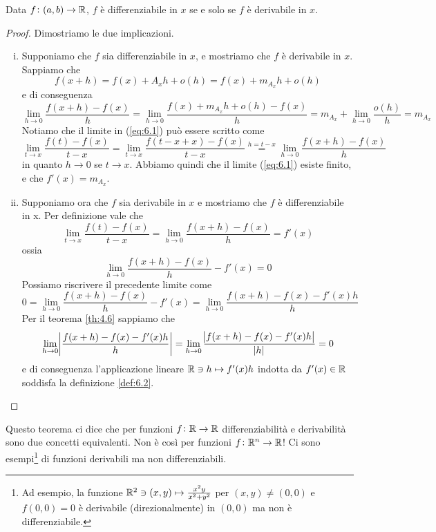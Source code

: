 \begin{theorem}
    \label{th:6.1}
    Data $f\colon (a,b)\to\amsbb{R}$, $f$ è differenziabile in $x$ se e solo se $f$ è derivabile in $x$.
\end{theorem}
\begin{proof}
    Dimostriamo le due implicazioni.
    \begin{enumerate}[(i)]
        \item Supponiamo che $f$ sia differenziabile in $x$, e mostriamo che $f$ è derivabile in $x$. Sappiamo che
        \[
        f(x+h)=f(x)+A_x h +o(h) = f(x)+m_{A_x}h +o(h)
        \]
        e di conseguenza
        \[
        \lim_{h\to 0} \frac{f(x+h)-f(x)}{h} = \lim_{h\to 0} \frac{f(x)+m_{A_x}h+o(h)-f(x)}{h} = m_{A_x}+\lim_{h\to 0} \frac{o(h)}{h} = m_{A_x} 
        \]
        Notiamo che il limite in (\ref{eq:6.1}) può essere scritto come
        \[
        \lim_{t\to x} \frac{f(t)-f(x)}{t-x} = \lim_{t\to x} \frac{f(t-x+x)-f(x)}{t-x}\overset{h=t-x}{=} \lim_{h\to 0} \frac{f(x+h)-f(x)}{h}
        \]
        in quanto $h\to 0$ se $t\to x$. Abbiamo quindi che il limite (\ref{eq:6.1}) esiste finito, e che $f'(x) = m_{A_x}$.
        \item Supponiamo ora che $f$ sia derivabile in $x$ e mostriamo che $f$ è differenziabile in x. Per definizione vale che
        \[
        \lim_{t\to x}\frac{f(t)-f(x)}{t-x} = \lim_{h\to 0}\frac{f(x+h)-f(x)}{h} = f'(x)
        \]
        ossia
        \[
        \lim_{h\to 0}\frac{f(x+h)-f(x)}{h}-f'(x) = 0
        \]
        Possiamo riscrivere il precedente limite come
        \[
        0=\lim_{h\to 0}\frac{f(x+h)-f(x)}{h}-f'(x) = \lim_{h\to 0} \frac{f(x+h)-f(x)-f'(x)h}{h}
        \]
        Per il teorema \ref{th:4.6} sappiamo che 
        \[
        \lim_{h\to 0}\abs{\frac{f(x+h)-f(x)-f'(x)h}{h}} = \lim_{h\to 0} \frac{\abs{f(x+h)-f(x)-f'(x)h}}{\abs{h}}=0
        \]
        e di conseguenza l'applicazione lineare $\amsbb{R}\ni h \mapsto f'(x)h$ indotta da $f'(x)\in\amsbb{R}$ soddisfa la definizione \ref{def:6.2}.
    \end{enumerate}
\end{proof}
\begin{remark}
    Questo teorema ci dice che per funzioni $f\colon \amsbb{R}\to \amsbb{R}$ differenziabilità e derivabilità sono due concetti equivalenti. Non è così per funzioni $f\colon \amsbb{R}^n\to \amsbb{R}$! Ci sono esempi\footnote{Ad esempio, la funzione $\amsbb{R}^2\ni (x,y)\mapsto \frac{x^2y}{x^2+y^2}$ per $(x,y)\ne (0,0)$ e $f(0,0)=0$ è derivabile (direzionalmente) in $(0,0)$ ma non è differenziabile.} di funzioni derivabili ma non differenziabili.
\end{remark}
